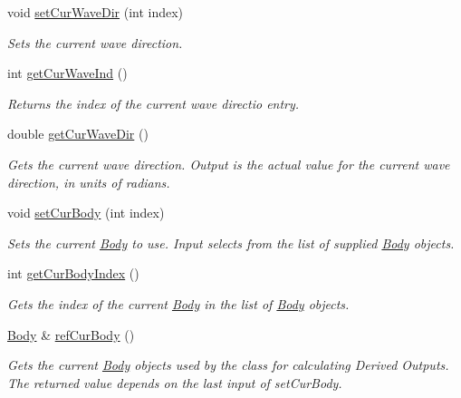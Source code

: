 \begin{DoxyCompactItemize}
void \hyperlink{classosea_1_1ofreq_1_1_outputs_body_a7d2b93ecaf1fa39257444bdf3194eacc}{set\-Cur\-Wave\-Dir} (int index)
\begin{DoxyCompactList}\small\item\em Sets the current wave direction. \end{DoxyCompactList}\item 
int \hyperlink{classosea_1_1ofreq_1_1_outputs_body_acac6b220f8d472d3cc7e9102022c88ff}{get\-Cur\-Wave\-Ind} ()
\begin{DoxyCompactList}\small\item\em Returns the index of the current wave directio entry. \end{DoxyCompactList}\item 
double \hyperlink{classosea_1_1ofreq_1_1_outputs_body_a21deeef0aaace27fa376c6222bc8b0a4}{get\-Cur\-Wave\-Dir} ()
\begin{DoxyCompactList}\small\item\em Gets the current wave direction. Output is the actual value for the current wave direction, in units of radians. \end{DoxyCompactList}\item 
void \hyperlink{classosea_1_1ofreq_1_1_outputs_body_a4b33361c2888937d2aa450f3e6df200d}{set\-Cur\-Body} (int index)
\begin{DoxyCompactList}\small\item\em Sets the current \hyperlink{classosea_1_1ofreq_1_1_body}{Body} to use. Input selects from the list of supplied \hyperlink{classosea_1_1ofreq_1_1_body}{Body} objects. \end{DoxyCompactList}\item 
int \hyperlink{classosea_1_1ofreq_1_1_outputs_body_a7331d48ef7cee6bd23ac0ab487894d6c}{get\-Cur\-Body\-Index} ()
\begin{DoxyCompactList}\small\item\em Gets the index of the current \hyperlink{classosea_1_1ofreq_1_1_body}{Body} in the list of \hyperlink{classosea_1_1ofreq_1_1_body}{Body} objects. \end{DoxyCompactList}\item 
\hyperlink{classosea_1_1ofreq_1_1_body}{Body} \& \hyperlink{classosea_1_1ofreq_1_1_outputs_body_afdb3f49b84baf1a6b2de8a5d014abfe5}{ref\-Cur\-Body} ()
\begin{DoxyCompactList}\small\item\em Gets the current \hyperlink{classosea_1_1ofreq_1_1_body}{Body} objects used by the class for calculating Derived Outputs. The returned value depends on the last input of set\-Cur\-Body. \end{DoxyCompactList}\item 

\end{DoxyCompactItemize}
